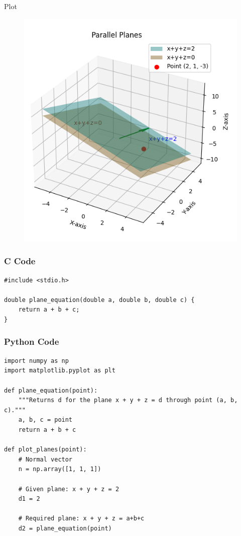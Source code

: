 \documentclass{beamer}
\begin{document}
\begin{frame}{Plot}
\begin{figure}
\centering
\includegraphics[height=0.6\textheight, keepaspectratio]{figs/q7.png}
\end{figure}
\end{frame}

\begin{frame}[fragile]
    \frametitle{C Code}
\begin{lstlisting}
#include <stdio.h>

double plane_equation(double a, double b, double c) {
    return a + b + c;
}

\end{lstlisting}
\end{frame}

\begin{frame}[fragile]
    \frametitle{Python Code}
\begin{lstlisting}
import numpy as np
import matplotlib.pyplot as plt

def plane_equation(point):
    """Returns d for the plane x + y + z = d through point (a, b, c)."""
    a, b, c = point
    return a + b + c

def plot_planes(point):
    # Normal vector
    n = np.array([1, 1, 1])
    
    # Given plane: x + y + z = 2
    d1 = 2
    
    # Required plane: x + y + z = a+b+c
    d2 = plane_equation(point)
    \end{lstlisting}
\end{frame}
\end{document}

